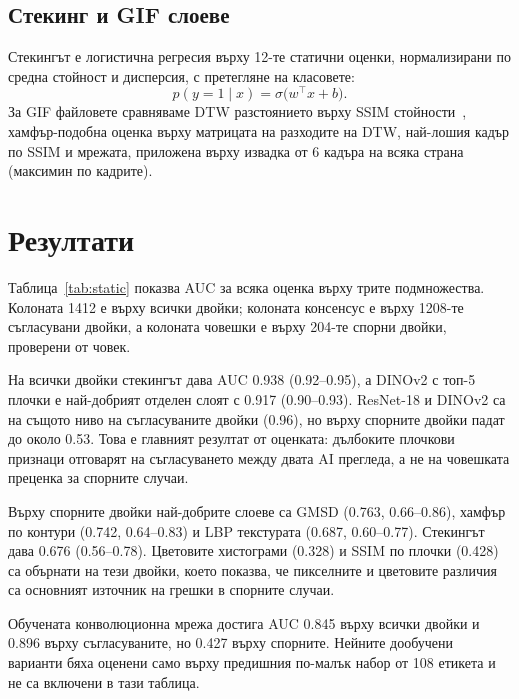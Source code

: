 \documentclass[a4paper,12pt]{article}
\begin{document}
\subsection{Стекинг и GIF слоеве}
Стекингът е логистична регресия върху 12-те статични оценки, нормализирани по средна стойност и дисперсия, с претегляне на класовете:
\begin{equation}\label{eq:stack}
p(y=1 \mid x) = \sigma\bigl(w^\top x + b\bigr).
\end{equation}
За GIF файловете сравняваме DTW разстоянието върху SSIM стойности~\cite{berndt1994}, хамфър-подобна оценка върху матрицата на разходите на DTW, най-лошия кадър по SSIM и мрежата, приложена върху извадка от 6 кадъра на всяка страна (максимин по кадрите).

\section{Резултати}\label{sec:results}

Таблица~\ref{tab:static} показва AUC за всяка оценка върху трите подмножества. Колоната 1412 е върху всички двойки; колоната консенсус е върху 1208-те съгласувани двойки, а колоната човешки е върху 204-те спорни двойки, проверени от човек.

\begin{table}[H]
\centering
\caption{AUC по слоеве върху всички 1412 двойки, върху съгласуваните 1208 двойки и върху 204-те спорни двойки, проверени от човек (доверителен интервал 95\%).}\label{tab:static}
\scriptsize

\end{table}

На всички двойки стекингът дава AUC 0.938 (0.92–0.95), а DINOv2 с топ-5 плочки е най-добрият отделен слоят с 0.917 (0.90–0.93). ResNet-18 и DINOv2 са на същото ниво на съгласуваните двойки (0.96), но върху спорните двойки падат до около 0.53. Това е главният резултат от оценката: дълбоките плочкови признаци отговарят на съгласуването между двата AI прегледа, а не на човешката преценка за спорните случаи.

Върху спорните двойки най-добрите слоеве са GMSD (0.763, 0.66–0.86), хамфър по контури (0.742, 0.64–0.83) и LBP текстурата (0.687, 0.60–0.77). Стекингът дава 0.676 (0.56–0.78). Цветовите хистограми (0.328) и SSIM по плочки (0.428) са обърнати на тези двойки, което показва, че пикселните и цветовите различия са основният източник на грешки в спорните случаи.

Обучената конволюционна мрежа достига AUC 0.845 върху всички двойки и 0.896 върху съгласуваните, но 0.427 върху спорните. Нейните дообучени варианти бяха оценени само върху предишния по-малък набор от 108 етикета и не са включени в тази таблица.
\end{document}
